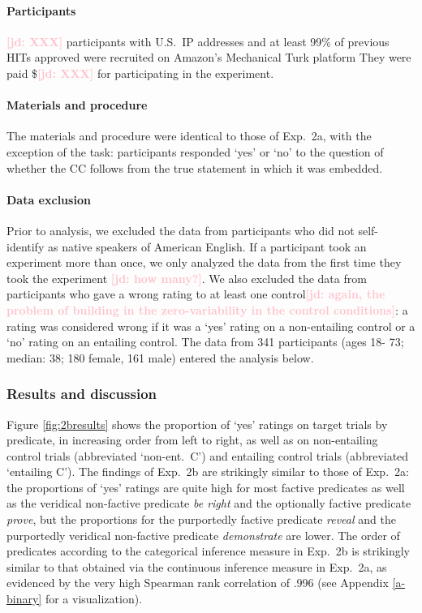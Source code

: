 \documentclass[11pt,fleqn]{article}
\newcommand{\jd}[1]{\textbf{\textcolor{Pink}{[jd: #1]}}}
\newcommand{\6}{\mbox{$[\hspace*{-.6mm}[$}}
\newcommand{\9}{\mbox{$]\hspace*{-.6mm}]$}}
\begin{document}
\paragraph{Participants} \jd{XXX} participants with U.S.\ IP addresses and at least 99\% of previous HITs approved were recruited on Amazon's Mechanical Turk platform They were paid \$\jd{XXX} for participating in the experiment.

\paragraph{Materials and procedure} The materials and procedure were identical to those of Exp.~2a, with the exception of the task: participants responded `yes' or `no' to the question of whether the CC follows from the true statement in which it was embedded. 

\paragraph{Data exclusion} Prior to analysis, we excluded the data from participants who did not self-identify as native speakers of American English. If a participant took an experiment more than once, we only analyzed the data from the first time they took the experiment \jd{how many?}. We also excluded the data from participants who gave a wrong rating to at least one control\jd{again, the problem of building in the zero-variability in the control conditions}: a rating was considered wrong if it was a `yes' rating on a non-entailing control or a `no' rating on an entailing control. The data from 341 participants (ages 18- 73; median: 38; 180 female, 161 male) entered the analysis below. 
    

\subsubsection{Results and discussion}

Figure \ref{fig:2bresults} shows the proportion of `yes' ratings on target trials by predicate, in increasing order from left to right, as well as on non-entailing control trials (abbreviated `non-ent.\ C') and entailing control trials (abbreviated `entailing C'). The findings of Exp.~2b are strikingly similar to those of Exp.~2a: the proportions of `yes' ratings are quite high for most factive predicates as well as the veridical non-factive predicate {\em be right} and the optionally factive predicate \emph{prove}, but the proportions for the purportedly factive predicate {\em reveal} and the purportedly veridical non-factive predicate {\em demonstrate} are lower. The order of predicates according to the categorical inference measure in  Exp.~2b is strikingly similar to that obtained via the continuous inference measure in Exp.~2a, as evidenced by the very high Spearman rank correlation of .996 (see Appendix \ref{a-binary} for a visualization).
\end{document}
